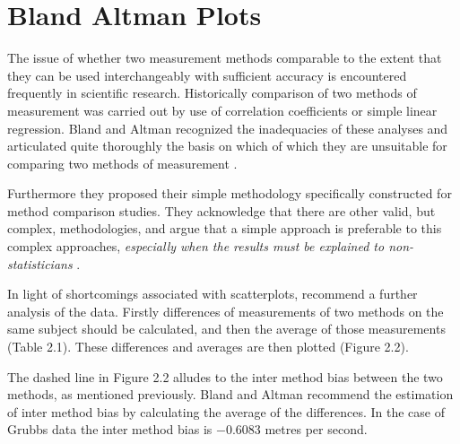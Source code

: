 \documentclass[12pt, a4paper]{report}
\theoremstyle{plain}
\theoremstyle{definition}
\theoremstyle{remark}
\begin{document}
	\newpage
	\section{Bland Altman Plots}
	The issue of whether two measurement methods comparable to the
	extent that they can be used interchangeably with sufficient
	accuracy is encountered frequently in scientific research.
	Historically comparison of two methods of measurement was carried
	out by use of correlation coefficients or simple linear
	regression. Bland and Altman recognized the inadequacies of these
	analyses and articulated quite thoroughly the basis on which of
	which they are unsuitable for comparing two methods of measurement
	\citep*{BA83}.
	
	
	Furthermore they proposed their simple methodology specifically
	constructed for method comparison studies. They acknowledge that
	there are other valid, but complex, methodologies, and argue that
	a simple approach is preferable to this complex approaches,
	\emph{especially when the results must be explained to
		non-statisticians} \citep*{BA83}.
	
	\smallskip
	
	
	
	In light of shortcomings associated with scatterplots,
	\citet*{BA83} recommend a further analysis of the data. Firstly
	differences of measurements of two methods on the same subject
	should  be calculated, and then the average of those measurements
	(Table 2.1). These differences and averages are then plotted
	(Figure 2.2).
	
	
	
	
	The dashed line in Figure 2.2 alludes to the inter method bias
	between the two methods, as mentioned previously. Bland and Altman
	recommend the estimation of inter method bias by calculating the
	average of the differences. In the case of Grubbs data the inter
	method bias is $-0.6083$ metres per second.
	\newpage
	
\end{document}
